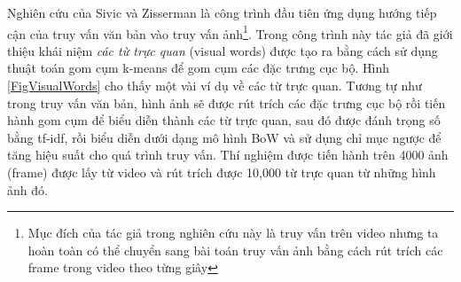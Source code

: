 Nghiên cứu của Sivic và Zisserman \cite{sivic2003video} là công trình đầu tiên ứng dụng hướng tiếp cận của truy vấn văn bản vào truy vấn ảnh\footnote{Mục đích của tác giả trong nghiên cứu này là truy vấn trên video nhưng ta hoàn toàn có thể chuyển sang bài toán truy vấn ảnh bằng cách rút trích các frame trong video theo từng giây}. Trong công trình này tác giả đã giới thiệu khái niệm \textit{các từ trực quan} (visual words) được tạo ra bằng cách sử dụng thuật toán gom cụm k-means để gom cụm các đặc trưng cục bộ. Hình \ref{FigVisualWords} cho thấy một vài ví dụ về các từ trực quan. Tương tự như trong truy vấn văn bản, hình ảnh sẽ được rút trích các đặc trưng cục bộ rồi tiến hành gom cụm để biểu diễn thành các từ trực quan, sau đó được đánh trọng số bằng tf-idf, rồi biểu diễn dưới dạng mô hình BoW và sử dụng chỉ mục ngược để tăng hiệu suất cho quá trình truy vấn. Thí nghiệm được tiến hành trên 4000 ảnh (frame) được lấy từ video và rút trích được 10,000 từ trực quan từ những hình ảnh đó.

